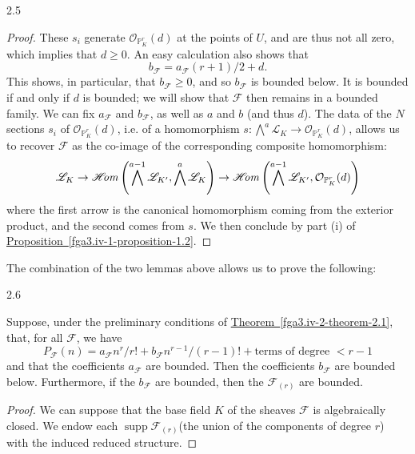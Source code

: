 \begin{lemma}{2.5}
\begin{proof}
      These \(s_i\) generate \(\mathcal {O}_{\mathbb {P}_K^r}(d)\) at the points of \(U\), and are thus not all zero, which implies that \(d\geqslant 0\).
      An easy calculation also shows that
      \[         b_\mathscr {F}         = a_\mathscr {F}(r+1)/2 + d.       \]
      This shows, in particular, that \(b_\mathscr {F}\geqslant 0\), and so \(b_\mathscr {F}\) is bounded below.
      It is bounded if and only if \(d\) is bounded;
      we will show that \(\mathscr {F}\) then remains in a bounded family.
      We can fix \(a_\mathscr {F}\) and \(b_\mathscr {F}\), as well as \(a\) and \(b\) (and thus \(d\)).
      The data of the \(N\) sections \(s_i\) of \(\mathcal {O}_{\mathbb {P}_K^r}(d)\), i.e. of a homomorphism \(s\colon \bigwedge ^a\mathscr {L}_K\to \mathcal {O}_{\mathbb {P}_K^r}(d)\), allows us to recover \(\mathscr {F}\) as the co-image of the corresponding composite homomorphism:
      \[         \mathscr {L}_K         \to  \mathscr {H}\kern  -2.5pt\mathit {om}\left ( \bigwedge ^{a-1}\mathscr {L}_{K'}, \bigwedge ^a\mathscr {L}_K \right )         \to  \mathscr {H}\kern  -2.5pt\mathit {om}\left ( \bigwedge ^{a-1}\mathscr {L}_{K'}, \mathcal {O}_{\mathbb {P}_K^r}(d) \right )       \]
      where the first arrow is the canonical homomorphism coming from the exterior product, and the second comes from \(s\).
      We then conclude by part (i) of \hyperref[fga3.iv-1-proposition-1.2]{Proposition~\ref*{fga3.iv-1-proposition-1.2}}.\end{proof}\end{lemma}\par{}The combination of the two lemmas above allows us to prove the following:\begin{lemma}{2.6}\label{fga3.iv-2-lemma-2.6}\skipsinglepar\par{}Suppose, under the preliminary conditions of \hyperref[fga3.iv-2-theorem-2.1]{Theorem~\ref*{fga3.iv-2-theorem-2.1}}, that, for all \(\mathscr {F}\), we have
    \[       P_\mathscr {F}(n)       = a_\mathscr {F} n^r/r! + b_\mathscr {F} n^{r-1}/(r-1)! + \text {terms of degree }<r-1     \]
    and that the coefficients \(a_\mathscr {F}\) are bounded.
    Then the coefficients \(b_\mathscr {F}\) are bounded below.
    Furthermore, if the \(b_\mathscr {F}\) are bounded, then the \(\mathscr {F}_{(r)}\) are bounded.\begin{proof}\par{}We can suppose that the base field \(K\) of the sheaves \(\mathscr {F}\) is algebraically closed.
      We endow each \(\operatorname {supp}\mathscr {F}_{(r)}\)(the union of the components of degree \(r\)) with the induced reduced structure.

\end{proof}
\end{lemma}
